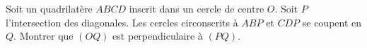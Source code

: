 Soit un quadrilatère $ABCD$ inscrit dans un cercle de centre $O$. Soit $P$ l'intersection des diagonales. Les cercles circonscrits à $ABP$ et $CDP$ se coupent en $Q$. Montrer que $(OQ)$ est perpendiculaire à $(PQ)$.
